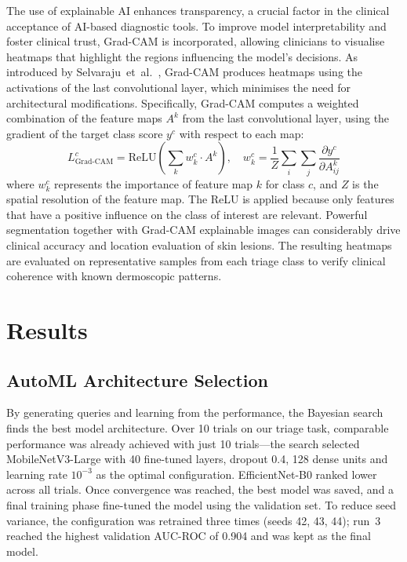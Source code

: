 \documentclass[conference]{IEEEtran}
\begin{document}
The use of explainable AI enhances transparency, a crucial factor in the clinical acceptance of AI-based diagnostic tools. To improve model interpretability and foster clinical trust, Grad-CAM is incorporated, allowing clinicians to visualise heatmaps that highlight the regions influencing the model's decisions. As introduced by Selvaraju~et~al.~\cite{b26}, Grad-CAM produces heatmaps using the activations of the last convolutional layer, which minimises the need for architectural modifications. Specifically, Grad-CAM computes a weighted combination of the feature maps $A^k$ from the last convolutional layer, using the gradient of the target class score $y^c$ with respect to each map:
\begin{equation}
L_{\text{Grad-CAM}}^{c} = \text{ReLU}\left(\sum_k w_k^c \cdot A^k\right), \quad w_k^c = \frac{1}{Z}\sum_i \sum_j \frac{\partial y^c}{\partial A_{ij}^k}
\label{eq:gradcam}
\end{equation}
where $w_k^c$ represents the importance of feature map $k$ for class $c$, and $Z$ is the spatial resolution of the feature map. The ReLU is applied because only features that have a positive influence on the class of interest are relevant. Powerful segmentation together with Grad-CAM explainable images can considerably drive clinical accuracy and location evaluation of skin lesions. The resulting heatmaps are evaluated on representative samples from each triage class to verify clinical coherence with known dermoscopic patterns.
 

\section{Results}
 
\subsection{AutoML Architecture Selection}
 
By generating queries and learning from the performance, the Bayesian search finds the best model architecture. Over 10 trials on our triage task, comparable performance was already achieved with just 10 trials---the search selected MobileNetV3-Large with 40 fine-tuned layers, dropout 0.4, 128 dense units and learning rate $10^{-3}$ as the optimal configuration. EfficientNet-B0 ranked lower across all trials. Once convergence was reached, the best model was saved, and a final training phase fine-tuned the model using the validation set. To reduce seed variance, the configuration was retrained three times (seeds 42, 43, 44); run~3 reached the highest validation AUC-ROC of 0.904 and was kept as the final model.
 
\end{document}
